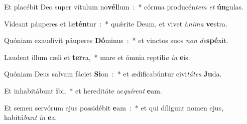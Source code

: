 \item Et placébit Deo super vítulum no\textbf{vél}lum~:~* córnua producén\emph{tem} \emph{et} \textbf{ún}gulas.
\item Vídeant páuperes et læ\textbf{tén}tur~:~* quǽrite Deum, et vivet á\emph{ni}\emph{ma} \textbf{ve}stra.
\item Quóniam exaudívit páuperes \textbf{Dó}minus~:~* et vinctos suos \emph{non} \emph{de}\textbf{spé}xit.
\item Laudent illum cæli et \textbf{ter}ra,~* mare et ómnia reptíli\emph{a} \emph{in} \textbf{e}is.\ifx\lalinebreakafterthirtynine\undefined\else\\\fi
\item Quóniam Deus salvam fáciet \textbf{Si}on~:~* et ædificabúntur civi\emph{tá}\emph{tes} \textbf{Ju}da.
\item Et inhabitábunt \textbf{i}bi,~* et hereditáte ac\emph{quí}\emph{rent} \textbf{e}am.
\item Et semen servórum ejus possidébit \textbf{e}am~:~* et qui díligunt nomen ejus, habitá\emph{bunt} \emph{in} \textbf{e}a.